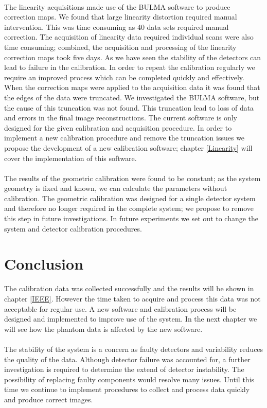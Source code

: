 \paragraph{}
The linearity acquisitions made use of the BULMA software to produce correction maps. We found that large linearity distortion required manual intervention. This was time consuming as 40 data sets required manual correction. The acquisition of linearity data required individual scans were also time consuming; combined, the acquisition and processing of the linearity correction maps took five days. As we have seen the stability of the detectors can lead to failure in the calibration. In order to repeat the calibration regularly we require an improved process which can be completed quickly and effectively. When the correction maps were applied to the acquisition data it was found that the edges of the data were truncated. We investigated the BULMA software, but the cause of this truncation was not found. This truncation lead to loss of data and errors in the final image reconstructions. The current software is only designed for the given calibration and acquisition procedure. In order to implement a new calibration procedure and remove the truncation issues we propose the development of a new calibration software; chapter \ref{Linearity} will cover the implementation of this software. 
\paragraph{}
The results of the geometric calibration were found to be constant; as the system geometry is fixed and known, we can calculate the parameters without calibration. The geometric calibration was designed for a single detector system and therefore no longer required in the complete system; we propose to remove this step in future investigations. In future experiments we set out to change the system and detector calibration procedures. 

\section{Conclusion}
The calibration data was collected successfully and the results will be shown in chapter \ref{IEEE}. However the time taken to acquire and process this data was not acceptable for regular use. A new software and calibration process will be designed and implemented to improve use of the system. In the next chapter we will see how the phantom data is affected by the new software.
\paragraph{}
The stability of the system is a concern as faulty detectors and variability reduces the quality of the data. Although detector failure was accounted for, a further investigation is required to determine the extend of detector instability. The possibility of replacing faulty components would resolve many issues. Until this time we continue to implement procedures to collect and process data quickly and  produce correct images.
